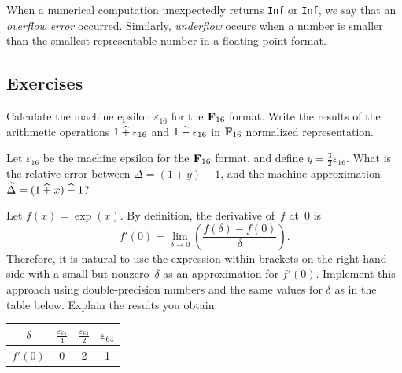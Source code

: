 When a numerical computation unexpectedly returns \texttt{Inf} or \texttt{Inf},
we say that an \emph{overflow error} occurred.
Similarly, \emph{underflow} occurs when a number
is smaller than the smallest representable number in a floating point format.

\subsection{Exercises}%


\begin{exercise}
    Calculate the machine epsilon $\varepsilon_{16}$ for the $\mathbf F_{16}$ format.
    Write the results of the arithmetic operations $1 \mathbin{\widehat +} \varepsilon_{16}$ and $1 \mathbin{\widehat -} \varepsilon_{16}$ in $\mathbf F_{16}$ normalized representation.
\end{exercise}

\begin{exercise}
    Let $\varepsilon_{16}$ be the machine epsilon for the $\mathbf F_{16}$ format,
    and define $y = \frac{3}{2} \varepsilon_{16}$.
    What is the relative error between $\Delta = (1 + y) - 1$,
    and the machine approximation $\widehat \Delta = (1 \mathbin{\widehat +} x) \mathbin{\widehat -} 1$?
\end{exercise}

\begin{exercise}
    Let $f(x) = \exp(x)$.
    By definition, the derivative of~$f$ at~$0$ is
    \[
        f'(0) = \lim_{\delta \to 0} \left( \frac{f(\delta) - f(0)}{\delta} \right).
    \]
    Therefore, it is natural to use the expression within brackets on the right-hand side
    with a small but nonzero~$\delta$ as an approximation for $f'(0)$.
    Implement this approach using double-precision numbers and the same values for $\delta$ as in the table below.
    Explain the results you obtain.
    \begin{center}
        \def\arraystretch{1.5}
        \begin{tabular}{|c|c|c|c|}
            \hline
            $\delta$ & $\frac{\varepsilon_{64}}{4} $ & $\frac{\varepsilon_{64}}{2}$ & $\varepsilon_{64}$ \\
            \hline
            $f'(0)$ & 0 & 2 & 1 \\
            \hline
        \end{tabular}
    \end{center}
\end{exercise}

